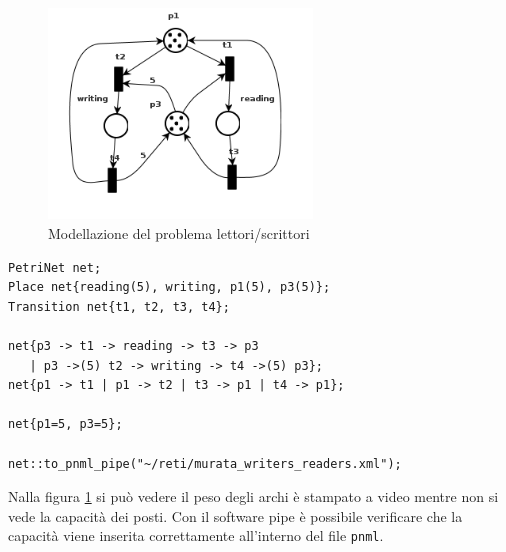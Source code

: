 \documentclass[italian,12pt]{book}
\begin{document}
\begin{figure}[htb]
\centerline{\includegraphics[width=7cm]{img/murata_writers_readers.png}}
\caption{Modellazione del problema lettori/scrittori}\label{fig:let_scrit.png}
\end{figure}

\begin{verbatim}PetriNet net;
Place net{reading(5), writing, p1(5), p3(5)};
Transition net{t1, t2, t3, t4};

net{p3 -> t1 -> reading -> t3 -> p3 
   | p3 ->(5) t2 -> writing -> t4 ->(5) p3};
net{p1 -> t1 | p1 -> t2 | t3 -> p1 | t4 -> p1};

net{p1=5, p3=5};

net::to_pnml_pipe("~/reti/murata_writers_readers.xml");
\end{verbatim}

Nalla figura \ref{fig:let_scrit.png} si può vedere il peso degli archi è stampato a video mentre non si vede la capacità dei posti. Con il software pipe è possibile verificare che la capacità viene inserita correttamente all'interno del file {\tt pnml}.

%


\end{document}
